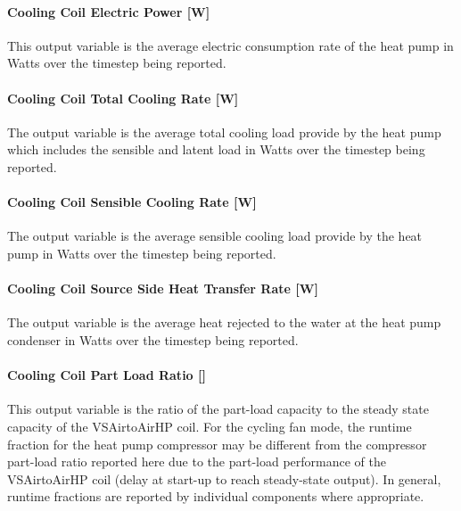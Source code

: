 \paragraph{Cooling Coil Electric Power {[}W{]}}\label{cooling-coil-electric-power-w-1}

This output variable is the average electric consumption rate of the heat pump in Watts over the timestep being reported.

\paragraph{Cooling Coil Total Cooling Rate {[}W{]}}\label{cooling-coil-total-cooling-rate-w-5}

The output variable is the average total cooling load provide by the heat pump which includes the sensible and latent load in Watts over the timestep being reported.

\paragraph{Cooling Coil Sensible Cooling Rate {[}W{]}}\label{cooling-coil-sensible-cooling-rate-w-5}

The output variable is the average sensible cooling load provide by the heat pump in Watts over the timestep being reported.

\paragraph{Cooling Coil Source Side Heat Transfer Rate {[}W{]}}\label{cooling-coil-source-side-heat-transfer-rate-w}

The output variable is the average heat rejected to the water at the heat pump condenser in Watts over the timestep being reported.

\paragraph{Cooling Coil Part Load Ratio {[]}}\label{cooling-coil-part-load-ratio}

This output variable is the ratio of the part-load capacity to the steady state capacity of the VSAirtoAirHP coil. For the cycling fan mode, the runtime fraction for the heat pump compressor may be different from the compressor part-load ratio reported here due to the part-load performance of the VSAirtoAirHP coil (delay at start-up to reach steady-state output). In general, runtime fractions are reported by individual components where appropriate.


